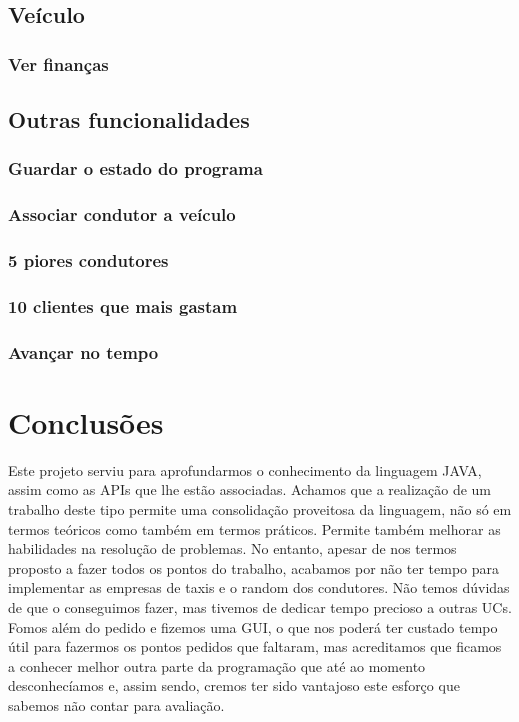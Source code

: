 \documentclass[a4paper]{article}
\begin{document}
\subsection{Veículo}
\subsubsection{Ver finanças}

\subsection{Outras funcionalidades}
\subsubsection{Guardar o estado do programa}
\subsubsection{Associar condutor a veículo}
\subsubsection{5 piores condutores}
\subsubsection{10 clientes que mais gastam}
\subsubsection{Avançar no tempo}


\section{Conclusões}
\label{sec:conclusao}
Este projeto serviu para aprofundarmos o conhecimento da linguagem JAVA, assim como as APIs que lhe estão associadas. Achamos que a realização de um trabalho deste tipo permite uma consolidação proveitosa da linguagem, não só em termos teóricos como também em termos práticos. Permite também melhorar as habilidades na resolução de problemas. No entanto, apesar de nos termos proposto a fazer todos os pontos do trabalho, acabamos por não ter tempo para implementar as empresas de taxis e o random dos condutores. Não temos dúvidas de que o conseguimos fazer, mas tivemos de dedicar tempo precioso a outras UCs. Fomos além do pedido e fizemos uma GUI, o que nos poderá ter custado tempo útil para fazermos os pontos pedidos que faltaram, mas acreditamos que ficamos a conhecer melhor outra parte da programação que até ao momento desconhecíamos e, assim sendo, cremos ter sido vantajoso este esforço que sabemos não contar para avaliação.
\end{document}
